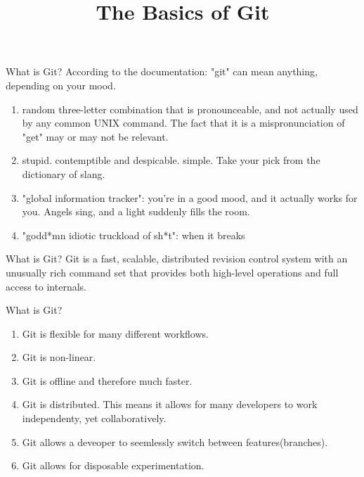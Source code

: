 \documentclass[14pt]{beamer}
\title{The Basics of Git}
\begin{document}
\begin{frame}
\titlepage
\end{frame}

\begin{frame}{What is Git?}
	According to the documentation:\newline
	"git" can mean anything, depending on your mood.
	\begin{enumerate}
		\small
		\item random three-letter combination that is pronounceable, and not
		   actually used by any common UNIX command.  The fact that it is a
		   mispronunciation of "get" may or may not be relevant.
		\item stupid. contemptible and despicable. simple. Take your pick from the
		   dictionary of slang.
		\item "global information tracker": you're in a good mood, and it actually
		   works for you. Angels sing, and a light suddenly fills the room.
		\item "godd*mn idiotic truckload of sh*t": when it breaks
	\end{enumerate}
\end{frame}

\begin{frame}{What is Git?}
	Git is a fast, scalable, distributed revision control system with an
	unusually rich command set that provides both high-level operations
	and full access to internals.
\end{frame}

\begin{frame}{What is Git?}
	\begin{enumerate}
		\small
		\item Git is flexible for many different workflows.
		\item Git is non-linear.
		\item Git is offline and therefore much faster.
		\item Git is distributed.  This means it allows for many
			developers to work independenty, yet collaboratively.
		\item Git allows a deveoper to seemlessly switch between features(branches).
		\item Git allows for disposable experimentation.
	\end{enumerate}
\end{frame}
\end{document}
